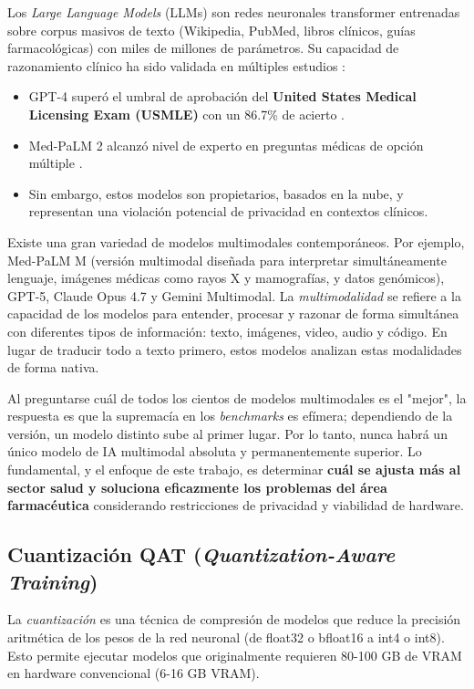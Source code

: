 \documentclass[12pt,a4paper]{article}
\begin{document}
Los \textit{Large Language Models} (LLMs) son redes neuronales transformer entrenadas sobre corpus
masivos de texto (Wikipedia, PubMed, libros clínicos, guías farmacológicas) con miles de millones
de parámetros. Su capacidad de razonamiento clínico ha sido validada en múltiples estudios
\citep{nori2023gpt4,singhal2022large}:

\begin{itemize}
  \item GPT-4 superó el umbral de aprobación del \textbf{United States Medical Licensing Exam (USMLE)}
    con un 86.7\% de acierto \citep{nori2023gpt4}.
  \item Med-PaLM 2 alcanzó nivel de experto en preguntas médicas de opción múltiple \citep{singhal2022large}.
  \item Sin embargo, estos modelos son propietarios, basados en la nube, y representan una
    violación potencial de privacidad en contextos clínicos.
\end{itemize}

Existe una gran variedad de modelos multimodales contemporáneos. Por ejemplo, Med-PaLM M (versión multimodal diseñada para interpretar simultáneamente lenguaje, imágenes médicas como rayos X y mamografías, y datos genómicos), GPT-5, Claude Opus 4.7 y Gemini Multimodal. La \textit{multimodalidad} se refiere a la capacidad de los modelos para entender, procesar y razonar de forma simultánea con diferentes tipos de información: texto, imágenes, video, audio y código. En lugar de traducir todo a texto primero, estos modelos analizan estas modalidades de forma nativa. 

Al preguntarse cuál de todos los cientos de modelos multimodales es el "mejor", la respuesta es que la supremacía en los \textit{benchmarks} es efímera; dependiendo de la versión, un modelo distinto sube al primer lugar. Por lo tanto, nunca habrá un único modelo de IA multimodal absoluta y permanentemente superior. Lo fundamental, y el enfoque de este trabajo, es determinar \textbf{cuál se ajusta más al sector salud y soluciona eficazmente los problemas del área farmacéutica} considerando restricciones de privacidad y viabilidad de hardware.

\subsection{Cuantización QAT (\textit{Quantization-Aware Training})}

La \textit{cuantización} es una técnica de compresión de modelos que reduce la precisión aritmética
de los pesos de la red neuronal (de float32 o bfloat16 a int4 o int8). Esto permite ejecutar
modelos que originalmente requieren 80-100 GB de VRAM en hardware convencional (6-16 GB VRAM).
\end{document}
